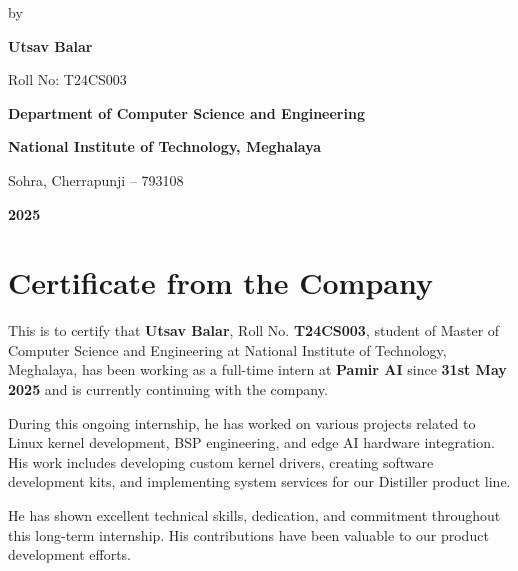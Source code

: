 \documentclass[12pt,a4paper]{report}
\begin{document}
\begin{titlepage}
    {\large by}

    \vspace{0.5cm}

    {\Large\bfseries Utsav Balar}

    {\large Roll No: T24CS003}

    \vfill

    {\large\bfseries Department of Computer Science and Engineering}

    {\large\bfseries National Institute of Technology, Meghalaya}

    {\large Sohra, Cherrapunji -- 793108}

    \vspace{0.5cm}

    {\large\bfseries 2025}

\end{titlepage}

\newpage
\chapter*{Certificate from the Company}

\vspace{1cm}

This is to certify that \textbf{Utsav Balar}, Roll No. \textbf{T24CS003}, student of Master of Computer Science and Engineering at National Institute of Technology, Meghalaya, has been working as a full-time intern at \textbf{Pamir AI} since \textbf{31st May 2025} and is currently continuing with the company.

\vspace{0.5cm}

During this ongoing internship, he has worked on various projects related to Linux kernel development, BSP engineering, and edge AI hardware integration. His work includes developing custom kernel drivers, creating software development kits, and implementing system services for our Distiller product line.

\vspace{0.5cm}

He has shown excellent technical skills, dedication, and commitment throughout this long-term internship. His contributions have been valuable to our product development efforts.

\vspace{0.5cm}
\end{document}
